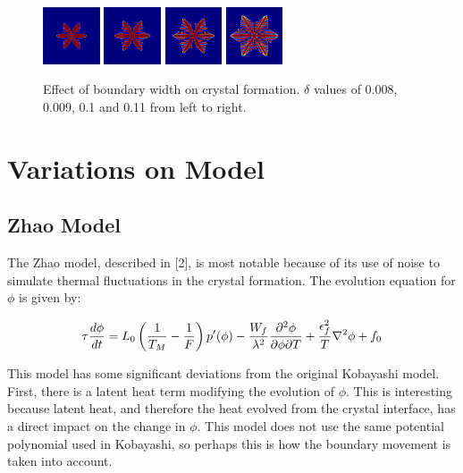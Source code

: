 \documentclass[10pt]{article} %
\begin{document}
\begin{figure}[h!]
  \centering
  \includegraphics[width=0.15\textwidth]{../d-0.008-5.png}
  \includegraphics[width=0.15\textwidth]{../d-0.09-5.png}
  \includegraphics[width=0.15\textwidth]{../d-0.1-5.png}
  \includegraphics[width=0.15\textwidth]{../d-0.11-5.png}
  \caption{Effect of boundary width on crystal formation. $\delta$ values of 0.008, 0.009, 0.1 and 0.11 from left to right.}
  \label{fig:delta}
\end{figure}

\section{Variations on Model}
\subsection*{Zhao Model}
The Zhao model, described in [2], is most notable because of its use of noise to simulate thermal fluctuations in the crystal formation. The evolution equation for $\phi$ is given by:

\begin{equation}
  \tau \frac{d\phi}{dt} = L_0\left(\frac{1}{T_M} - \frac{1}{F}\right)p'(\phi) - \frac{W_f}{\lambda^2}\frac{\partial^2\phi}{\partial\phi\partial T} + \frac{\epsilon_f^2}{T}\nabla^2\phi + f_0\\
\end{equation}

This model has some significant deviations from the original Kobayashi model. First, there is a latent heat term modifying the evolution of $\phi$. This is interesting because latent heat, and therefore the heat evolved from the crystal interface, has a direct impact on the change in $\phi$. This model does not use the same potential polynomial used in Kobayashi, so perhaps this is how the boundary movement is taken into account.\\
\end{document}
